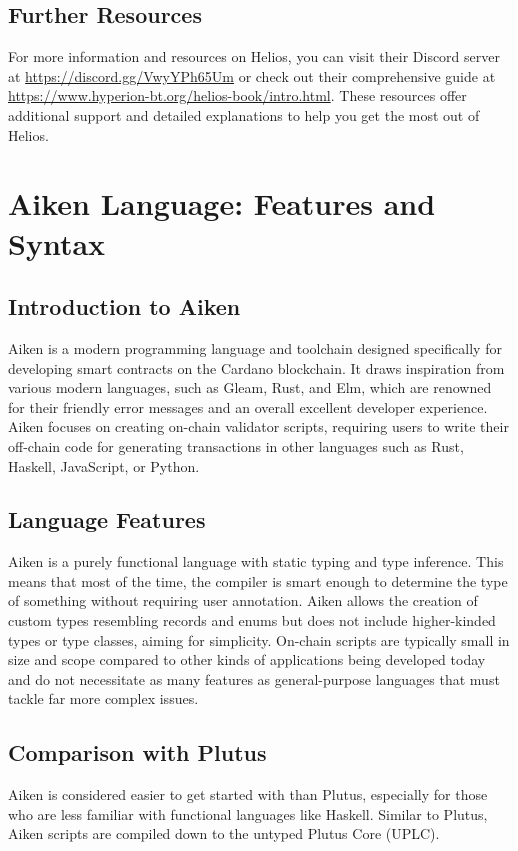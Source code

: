 \subsection{Further Resources}

For more information and resources on Helios, you can visit their Discord server at \url{https://discord.gg/VwyYPh65Um} or check out their comprehensive guide at \url{https://www.hyperion-bt.org/helios-book/intro.html}. These resources offer additional support and detailed explanations to help you get the most out of Helios.



\section{Aiken Language: Features and Syntax} \label{sec:Languages}

\subsection{Introduction to Aiken}
Aiken is a modern programming language and toolchain designed specifically for developing smart contracts on the Cardano blockchain. It draws inspiration from various modern languages, such as Gleam, Rust, and Elm, which are renowned for their friendly error messages and an overall excellent developer experience. Aiken focuses on creating on-chain validator scripts, requiring users to write their off-chain code for generating transactions in other languages such as Rust, Haskell, JavaScript, or Python.

\subsection{Language Features}
Aiken is a purely functional language with static typing and type inference. This means that most of the time, the compiler is smart enough to determine the type of something without requiring user annotation. Aiken allows the creation of custom types resembling records and enums but does not include higher-kinded types or type classes, aiming for simplicity. On-chain scripts are typically small in size and scope compared to other kinds of applications being developed today and do not necessitate as many features as general-purpose languages that must tackle far more complex issues.

\subsection{Comparison with Plutus}
Aiken is considered easier to get started with than Plutus, especially for those who are less familiar with functional languages like Haskell. Similar to Plutus, Aiken scripts are compiled down to the untyped Plutus Core (UPLC).

